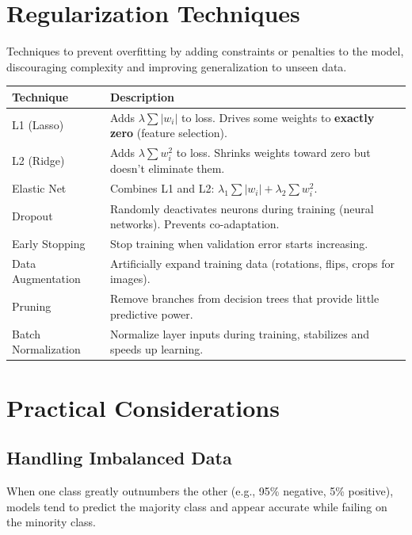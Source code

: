 \documentclass[11pt,a4paper]{article}
\begin{document}
\section{Regularization Techniques}

\begin{conceptbox}[Regularization]
Techniques to prevent overfitting by adding constraints or penalties to the model, discouraging complexity and improving generalization to unseen data.
\end{conceptbox}

\begin{longtable}{@{}p{3.5cm}p{10cm}@{}}
\toprule
\rowcolor{primary!15}
\textbf{Technique} & \textbf{Description} \\
\midrule
\endhead
L1 (Lasso) & Adds $\lambda\sum|w_i|$ to loss. Drives some weights to \textbf{exactly zero} (feature selection). \\
\addlinespace
L2 (Ridge) & Adds $\lambda\sum w_i^2$ to loss. Shrinks weights toward zero but doesn't eliminate them. \\
\addlinespace
Elastic Net & Combines L1 and L2: $\lambda_1\sum|w_i| + \lambda_2\sum w_i^2$. \\
\addlinespace
Dropout & Randomly deactivates neurons during training (neural networks). Prevents co-adaptation. \\
\addlinespace
Early Stopping & Stop training when validation error starts increasing. \\
\addlinespace
Data Augmentation & Artificially expand training data (rotations, flips, crops for images). \\
\addlinespace
Pruning & Remove branches from decision trees that provide little predictive power. \\
\addlinespace
Batch Normalization & Normalize layer inputs during training, stabilizes and speeds up learning. \\
\bottomrule
\end{longtable}

\section{Practical Considerations}

\subsection{Handling Imbalanced Data}
\begin{alertbox}
When one class greatly outnumbers the other (e.g., 95\% negative, 5\% positive), models tend to predict the majority class and appear accurate while failing on the minority class.
\end{alertbox}
\end{document}
